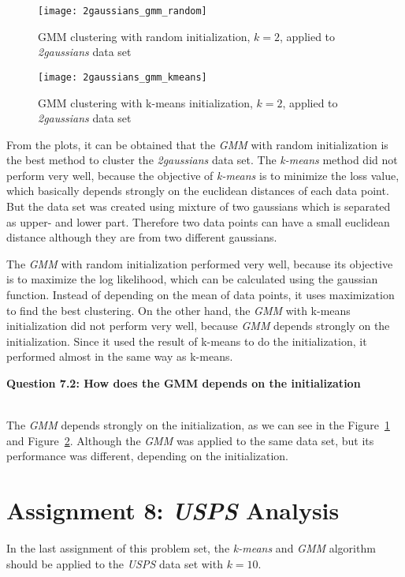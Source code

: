 \begin{figure}[h!]
	\centering
	\texttt{[image: 2gaussians\_gmm\_random]}
	\caption{GMM clustering with random initialization, $k=2$, applied to \textit{2gaussians} data set}
	\label{fig:2gaussians_gmm_random}
\end{figure}

\begin{figure}[h!]
	\centering
	\texttt{[image: 2gaussians\_gmm\_kmeans]}
	\caption{GMM clustering with k-means initialization, $k=2$, applied to \textit{2gaussians} data set}
	\label{fig:2gaussians_gmm_kmeans}
\end{figure}

From the plots, it can be obtained that the \textit{GMM} with random initialization is the best method to cluster the \textit{2gaussians} data set. The \textit{k-means} method did not perform very well, because the objective of \textit{k-means} is to minimize the loss value, which basically depends strongly on the euclidean distances of each data point. But the data set was created using mixture of two gaussians which is separated as upper- and lower part. Therefore two data points can have a small euclidean distance although they are from two different gaussians. 

The \textit{GMM} with random initialization performed very well, because its objective is to maximize the log likelihood, which can be calculated using the gaussian function. Instead of depending on the mean of data points, it uses maximization to find the best clustering. On the other hand, the \textit{GMM} with k-means initialization did not perform very well, because \textit{GMM} depends strongly on the initialization. Since it used the result of k-means to do the initialization, it performed almost in the same way as k-means.

{\raggedright \textbf{Question 7.2: How does the GMM depends on the initialization}}\\

The \textit{GMM} depends strongly on the initialization, as we can see in the Figure~\ref{fig:2gaussians_gmm_random} and Figure~\ref{fig:2gaussians_gmm_kmeans}. Although the \textit{GMM} was applied to the same data set, but its performance was different, depending on the initialization.


\section{Assignment 8: \textit{USPS} Analysis}
\label{assignment8}

In the last assignment of this problem set, the \textit{k-means} and \textit{GMM} algorithm should be applied to the \textit{USPS} data set with $k=10$.

